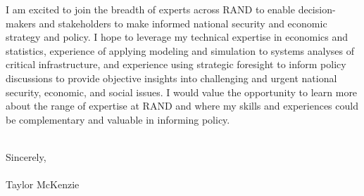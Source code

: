 \documentclass[10pt]{article}
\begin{document}
I am excited to join the breadth of experts across RAND to enable decision-makers and stakeholders to make informed national security and economic strategy and policy. I hope to leverage my technical expertise in economics and statistics, experience of applying modeling and simulation to systems analyses of critical infrastructure, and experience using strategic foresight to inform policy discussions to provide objective insights into challenging and urgent national security, economic, and social issues. I would value the opportunity to learn more about the range of expertise at RAND and where my skills and experiences could be complementary and valuable in informing policy.

\noindent \\Sincerely,\\\\
Taylor McKenzie
\end{document}
